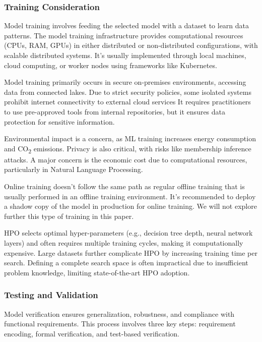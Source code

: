 \subsubsection{Training Consideration}

Model training involves feeding the selected model with a dataset to learn data patterns.
The model training infrastructure provides computational resources (CPUs, RAM, GPUs) in either distributed or non-distributed configurations, with scalable distributed systems.
It's usually implemented through local machines, cloud computing, or worker nodes using frameworks like Kubernetes\cite{Kreuzberger2022MachineLO, Haakman2021}.

Model training primarily occurs in secure on-premises environments, accessing data from connected lakes\cite{Haakman2021}.
Due to strict security policies, some isolated systems prohibit internet connectivity to external cloud services
It requires practitioners to use pre-approved tools from internal repositories, but it ensures data protection for sensitive information\cite{Haakman2021}.

Environmental impact is a concern, as ML training increases energy consumption and CO\textsubscript{2} emissions\cite{10.1145/3533378}.
Privacy is also critical, with risks like membership inference attacks\cite{10.1145/3533378, 10.1145/3555803}.
A major concern is the economic cost due to computational resources, particularly in Natural Language Processing\cite{10.1145/3533378}.

Online training doesn't follow the same path as regular offline training that is usually performed in an offline training environment.
It's recommended to deploy a shadow copy of the model in production for online training\cite{treveil2020introducing}.
We will not explore further this type of training in this paper.

HPO selects optimal hyper-parameters (e.g., decision tree depth, neural network layers) and often requires multiple training cycles, making it computationally expensive.
Large datasets further complicate HPO by increasing training time per search\cite{10.1145/3533378}.
Defining a complete search space is often impractical due to insufficient problem knowledge, limiting state-of-the-art HPO adoption.

\subsubsection{Testing and Validation}
Model verification ensures generalization, robustness, and compliance with functional requirements.
This process involves three key steps: requirement encoding, formal verification, and test-based verification\cite{10.1145/3533378}.

